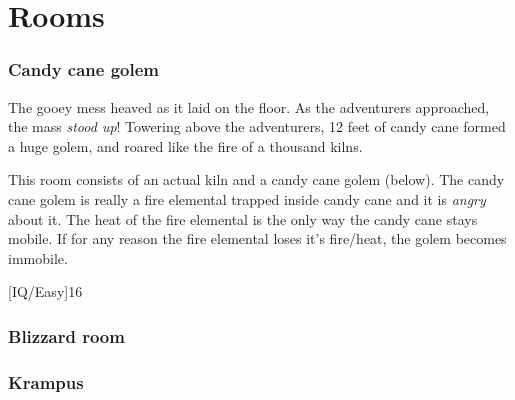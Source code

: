 \documentclass[a4paper,twocolumn]{memoir}
\begin{document}
\chapter{Rooms}
\label{cha:rooms}

\subsection{Candy cane golem}
\label{sec:candy-cane-golem}

\begin{vignette}
  The gooey mess heaved as it laid on the floor. As the adventurers approached,
  the mass \emph{stood up}! Towering above the adventurers, 12 feet of candy
  cane formed a huge golem, and roared like the fire of a thousand kilns. 
\end{vignette}

This room consists of an actual kiln and a candy cane golem (below). The candy
cane golem is really a fire elemental trapped inside candy cane and it is
\emph{angry} about it. The heat of the fire elemental is the only way the candy
cane stays mobile. If for any reason the fire elemental loses it's fire/heat,
the golem becomes immobile.


\begin{character}
  [IQ/Easy]{16}
\end{character}

\subsection{Blizzard room}
\label{sec:blizzard-room}


\subsection{Krampus}
\label{sec:krampus}

\end{document}
